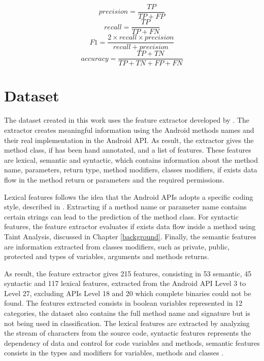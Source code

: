 \begin{multicols}{2}%
    \noindent%
    {%
    \begin{equation} \label{precision} precision = \frac{TP}{TP+FP} \end{equation}%
    \begin{equation} \label{recall} recall = \frac{TP}{TP+FN} \end{equation}%
    }%
    {%
    \begin{equation} \label{f1} F1 = \frac{2 \times recall \times precision}{recall + precision} \end{equation}%
    \begin{equation} \label{accuracy} accuracy = \frac{TP+TN}{TP+TN+FP+FN} \end{equation}%
    }%
\end{multicols}

\section{Dataset}\label{dset_section}

The dataset created in this work uses the feature extractor developed by \cite{rasthofer2014machine}. The extractor creates meaningful information using the Android methods names and their real implementation in the Android API. As result, the extractor gives the method class, if has been hand annotated, and a list of features. These features are lexical, semantic and syntactic, which contains information about the method name, parameters, return type, method modifiers, classes modifiers, if exists data flow in the method return or parameters and the required permissions.

Lexical features follows the idea that the Android APIs adopts a specific coding style, described in \cite{androidcoderef}. Extracting if a method name or parameter name contains certain strings can lead to the prediction of the method class. For syntactic features, the feature extractor evaluates if exists data flow inside a method using Taint Analysis, discussed in Chapter \ref{background}. Finally, the semantic features are information extracted from classes modifiers, such as private, public, protected and types of variables, arguments and methods returns.

As result, the feature extractor gives 215 features, consisting in 53 semantic, 45 syntactic and 117 lexical features, extracted from the Android API Level 3 to Level 27, excluding APIs Level 18 and 20 which complete binaries could not be found. The features extracted consists in boolean variables represented in 12 categories, the dataset also contains the full method name and signature but is not being used in classification. The lexical features are extracted by analyzing the stream of characters from the source code, syntactic features represents the dependency of data and control for code variables and methods, semantic features consists in the types and modifiers for variables, methods and classes \cite{aho2003compilers}.

